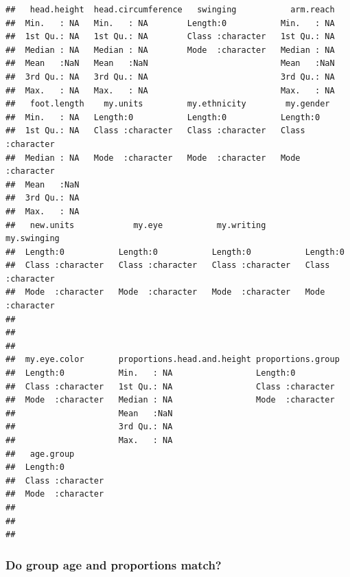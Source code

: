 \documentclass[]{article}
\begin{document}
\begin{verbatim}
##   head.height  head.circumference   swinging           arm.reach  
##  Min.   : NA   Min.   : NA        Length:0           Min.   : NA  
##  1st Qu.: NA   1st Qu.: NA        Class :character   1st Qu.: NA  
##  Median : NA   Median : NA        Mode  :character   Median : NA  
##  Mean   :NaN   Mean   :NaN                           Mean   :NaN  
##  3rd Qu.: NA   3rd Qu.: NA                           3rd Qu.: NA  
##  Max.   : NA   Max.   : NA                           Max.   : NA  
##   foot.length    my.units         my.ethnicity        my.gender        
##  Min.   : NA   Length:0           Length:0           Length:0          
##  1st Qu.: NA   Class :character   Class :character   Class :character  
##  Median : NA   Mode  :character   Mode  :character   Mode  :character  
##  Mean   :NaN                                                           
##  3rd Qu.: NA                                                           
##  Max.   : NA                                                           
##   new.units            my.eye           my.writing        my.swinging       
##  Length:0           Length:0           Length:0           Length:0          
##  Class :character   Class :character   Class :character   Class :character  
##  Mode  :character   Mode  :character   Mode  :character   Mode  :character  
##                                                                             
##                                                                             
##                                                                             
##  my.eye.color       proportions.head.and.height proportions.group 
##  Length:0           Min.   : NA                 Length:0          
##  Class :character   1st Qu.: NA                 Class :character  
##  Mode  :character   Median : NA                 Mode  :character  
##                     Mean   :NaN                                   
##                     3rd Qu.: NA                                   
##                     Max.   : NA                                   
##   age.group        
##  Length:0          
##  Class :character  
##  Mode  :character  
##                    
##                    
## 
\end{verbatim}

\newpage

\subsubsection{Do group age and proportions match?}
\label{sec:appendix-group-age-vs-proportions}
\end{document}
